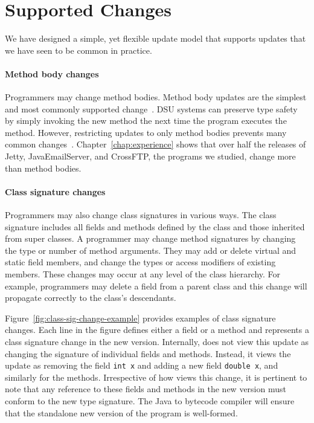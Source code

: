 \section{Supported Changes}
\label{sec:supported-changes}

We have designed a simple, yet flexible update model that supports updates
that we have seen to be common in practice.

\paragraph{Method body changes}
Programmers may change method bodies. Method body updates are the simplest
and most commonly supported change~\cite{JVMhotswap, VSEnC, eaddy05enc,
GilmoreKW97, orso:java, K42reconfig, HjalmtyssonG98}. DSU systems
can preserve type safety by simply invoking the new method the next time
the program executes the method. However, restricting updates to only method
bodies prevents many common changes~\cite{neamtiu05evolution}.
Chapter~\ref{chap:experience} shows that over half the releases of Jetty,
JavaEmailServer, and CrossFTP, the programs we studied, change more than method bodies.

\paragraph{Class signature changes}
Programmers may also change class signatures in various ways.
The class signature includes all fields and methods defined by the class
and those inherited from super classes. A programmer may change method
signatures by changing the type or number of method arguments. They
may add or delete virtual and static field members, and change the types or
access modifiers of existing members.  These changes may occur at any level
of the class hierarchy.  For example, programmers may delete a field from a
parent class and this change will propagate correctly to the class's
descendants.





Figure~\ref{fig:class-sig-change-example} provides examples of class
signature changes. Each line in the figure defines either a field or a
method and represents a class signature change in the new version.
Internally, \UPT does not view this update as changing the signature of
individual fields and methods. Instead, it views the update as removing the
field {\tt int x} and adding a new field {\tt double x}, and similarly for
the methods. Irrespective of how \UPT views this change, it is pertinent to
note that any reference to these fields and methods in the new version must
conform to the new type signature. The Java to bytecode compiler
will ensure that the standalone new version of the program is well-formed.

